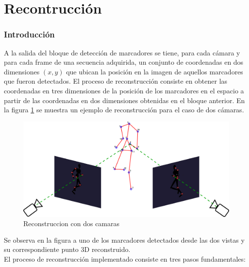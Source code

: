 

\section{Recontrucción}


\subsubsection{Introducción}

A la salida del bloque de detección de marcadores se tiene,  para cada cámara y para cada frame de una secuencia adquirida, un conjunto de coordenadas en dos dimensiones $(x,y)$ que ubican la posición en la imagen de aquellos marcadores que fueron detectados. 
El proceso de reconstrucción consiste en obtener las coordenadas en tres dimensiones de la posición de los marcadores en el espacio a partir de  las coordenadas en dos dimensiones obtenidas en el bloque anterior.
En la figura \ref{fig: esquema_reconstruccion} se muestra un ejemplo de reconstrucción para el caso de dos cámaras.\\


\begin{figure}[h!]
\begin{center}
\includegraphics[scale=0.25]{img/Reconstruccion/ejemplo_reconstruccion1.png}
\end{center}
\caption{Reconstruccion con dos camaras}
\label{fig: esquema_reconstruccion}
\end{figure}


Se observa en la figura a uno de los marcadores detectados desde las dos vistas y su correspondiente punto 3D reconstruido.\\

El proceso de reconstrucción implementado consiste en tres pasos fundamentales:


